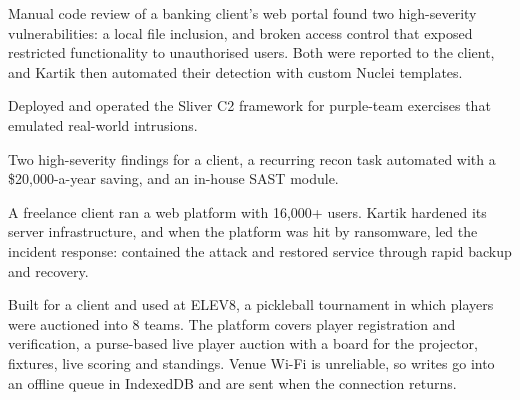  Manual code review of a banking client's web portal found two high-severity
vulnerabilities: a local file inclusion, and broken access control that exposed restricted
functionality to unauthorised users. Both were reported to the client, and Kartik then automated
their detection with custom Nuclei templates.

 Deployed and operated the Sliver C2 framework for purple-team exercises that
emulated real-world intrusions.

 Two high-severity findings for a client, a recurring recon task automated with a
\tld\$20,000-a-year saving, and an in-house SAST module.


A freelance client ran a web platform with 16,000+ users. Kartik hardened its server
infrastructure, and when the platform was hit by ransomware, led the incident response: contained
the attack and restored service through rapid backup and recovery.

Built for a client and used at ELEV8, a pickleball tournament in which  players were
auctioned into 8 teams. The platform covers player registration and verification, a purse-based
live player auction with a board for the projector, fixtures, live scoring and standings. Venue
Wi-Fi is unreliable, so writes go into an offline queue in IndexedDB and are sent when the
connection returns.

\begin{facts}
\end{facts}
